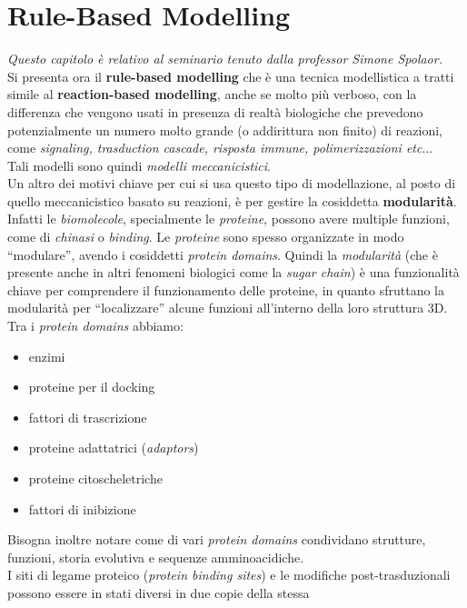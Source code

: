 \documentclass[a4paper,12pt, oneside]{book}
\begin{document}
\chapter{Rule-Based Modelling}
\textit{Questo capitolo è relativo al seminario tenuto dalla professor
  Simone Spolaor.}\\
Si presenta ora il \textbf{rule-based modelling} che è una tecnica modellistica
a tratti simile al \textbf{reaction-based modelling}, anche se molto più
verboso, con la differenza che 
vengono usati in presenza di realtà biologiche che prevedono potenzialmente un
numero molto grande (o addirittura non finito) di reazioni, come
\textit{signaling, trasduction cascade, risposta immune, polimerizzazioni
  etc}$\ldots$\\
Tali modelli sono quindi \textit{modelli meccanicistici}.\\
Un altro dei motivi chiave per cui si usa questo tipo di modellazione, al posto
di quello meccanicistico basato su reazioni, è per
gestire la cosiddetta \textbf{modularità}. Infatti le \textit{biomolecole},
specialmente le \textit{proteine}, possono avere multiple funzioni, come di
\textit{chinasi} o \textit{binding}. Le
\textit{proteine} sono spesso organizzate in modo ``modulare'', avendo i
cosiddetti \textit{protein domains}. Quindi la \textit{modularità} (che è
presente anche in altri fenomeni biologici come la \textit{sugar chain}) è una
funzionalità chiave per comprendere il funzionamento delle proteine, in quanto
sfruttano la modularità per “localizzare” alcune funzioni all'interno della loro
struttura 3D. Tra i \textit{protein domains} abbiamo:
\begin{multicols}{2}
  \begin{itemize}
    \item enzimi
    \item proteine per il docking
    \item fattori di trascrizione
    \item proteine adattatrici (\textit{adaptors})
    \item proteine citoscheletriche
    \item fattori di inibizione
  \end{itemize}
\end{multicols}
\noindent
Bisogna inoltre notare come di vari \textit{protein domains} condividano
strutture, funzioni, storia evolutiva e sequenze amminoacidiche.\\
I siti di legame proteico (\textit{protein binding sites}) e le modifiche
post-trasduzionali possono essere in stati diversi in due copie della stessa
\end{document}
